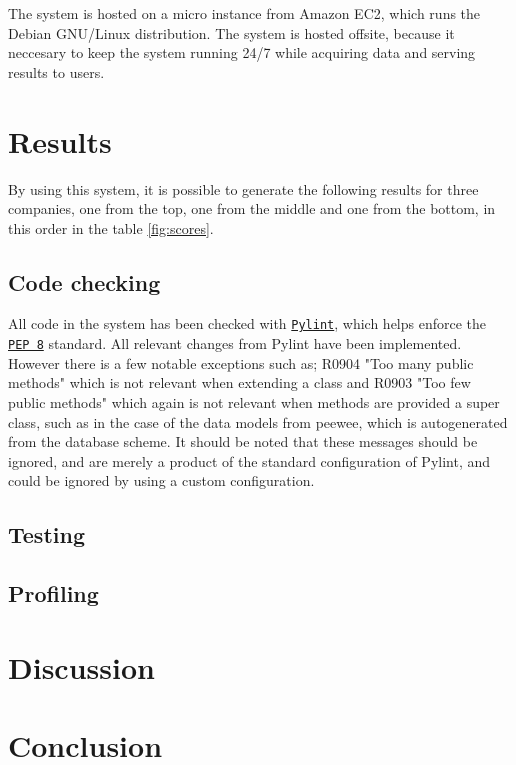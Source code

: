 \documentclass[10pt]{IEEEtran}
\begin{document}
The system is hosted on a micro instance from Amazon EC2, which runs the Debian GNU/Linux distribution. The system is hosted offsite, because it neccesary to keep the system running 24/7 while acquiring data and serving results to users.

\section{Results}
By using this system, it is possible to generate the following results for three companies, one from the top, one from the middle and one from the bottom, in this order in the table \ref{fig:scores}.

\subsection{Code checking}
All code in the system has been checked with \href{http://www.pylint.org/}{\texttt{Pylint}}, which helps enforce the \href{http://www.python.org/dev/peps/pep-0008/}{\texttt{PEP 8}} standard. All relevant changes from Pylint have been implemented. However there is a few notable exceptions such as; R0904 "Too many public methods" which is not relevant when extending a class and R0903 "Too few public methods" which again is not relevant when methods are provided a super class, such as in the case of the data models from peewee, which is autogenerated from the database scheme. It should be noted that these messages should be ignored, and are merely a product of the standard configuration of Pylint, and could be ignored by using a custom configuration.

\subsection{Testing}


\subsection{Profiling}


\section{Discussion}


\section{Conclusion}



\end{document}

